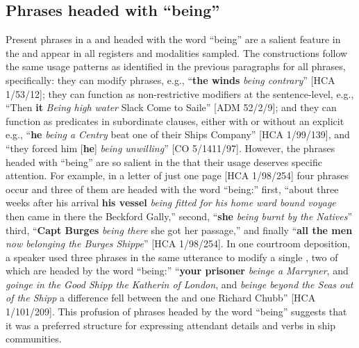 \subsection{{Phrases headed with “being”}}\label{sec:5.5.3}

Present  phrases in a  and headed with the word “being” are a salient feature in the  and appear in all registers and modalities sampled. The  constructions follow the same usage patterns as identified in the previous paragraphs for all  phrases, specifically: they can modify  phrases, e.g., “\textbf{the winds} \textit{being contrary}” [HCA 1/53/12]; they can function as non-restrictive modifiers at the sentence-level, e.g., “Then \textbf{it} \textit{Being high water} Slack Come to Saile” [ADM 52/2/9]; and they can function as predicates in subordinate clauses, either with or without an explicit  e.g., “\textbf{he} \textit{being a Centry} beat one of their Ships Company” [HCA 1/99/139], and “they forced him [\textbf{he}] \textit{being unwilling}” [CO 5/1411/97]. However, the  phrases headed with “being” are so salient in the  that their usage deserves specific attention. For example, in a letter of just one page [HCA 1/98/254] four  phrases occur and three of them are headed with the word “being:” first, “about three weeks after his arrival \textbf{his vessel} \textit{being fitted for his home ward bound voyage} then came in there the Beckford Gally,” second, “\textbf{she} \textit{being burnt by the Natives}” third, “\textbf{Capt Burges} \textit{being there} she got her passage,” and finally “\textbf{all the men} \textit{now belonging the Burges Shippe}” [HCA 1/98/254]. In one courtroom deposition, a speaker used three  phrases in the same utterance to modify a single , two of which are headed by the word “being:” “\textbf{your prisoner} \textit{beinge a Marryner}, and \textit{goinge in the Good Shipp the Katherin of London}, and \textit{beinge beyond the Seas out of the Shipp} a difference fell between the  and one Richard Chubb” [HCA 1/101/209]. This profusion of  phrases headed by the word “being” suggests that it was a preferred structure for expressing attendant details and  verbs in ship communities. 

